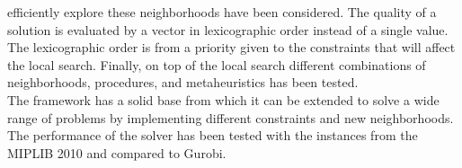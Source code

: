efficiently explore these neighborhoods have been considered. The quality of a solution is evaluated by a vector in 
lexicographic order instead of a single value. The lexicographic order is from a priority given to the constraints that 
will affect the local search. Finally, on top of the local search different combinations of neighborhoods, procedures, 
and metaheuristics has been tested. \medskip \\   
The framework has a solid base from which it can be extended to solve a wide range of problems by implementing 
different constraints and new neighborhoods. \medskip \\
The performance of the solver has been tested with the instances from the MIPLIB 2010 and compared to Gurobi.  


